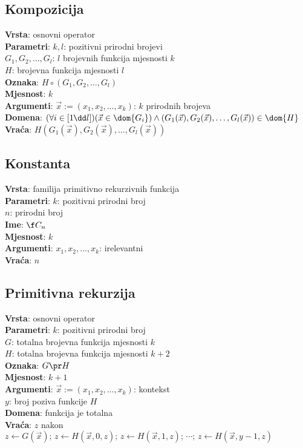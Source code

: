 \subsection{Kompozicija}
\textbf{Vrsta}: osnovni operator\\
\textbf{Parametri}: $k,l$: pozitivni prirodni brojevi\\
$G_1,G_2,\dots,G_l$: $l$ brojevnih funkcija mjesnosti $k$\\
$H$: brojevna funkcija mjesnosti $l$\\
\textbf{Oznaka}: $H\circ(G_1,G_2,\dots,G_l)$\\
\textbf{Mjesnost}: $k$\\
\textbf{Argumenti}: $\vec x:=(x_1,x_2,\dots,x_k)$: $k$ prirodnih brojeva\\
\textbf{Domena}: $(\forall i\in[1\mspace{-1mu}\dd l])(\vec x\in\dom{G_i})\land(G_1(\vec x),G_2(\vec x),\dots,G_l(\vec x))\in\dom{H}$\\
\textbf{Vraća}: $H(G_1(\vec x),G_2(\vec x),\dots,G_l(\vec x))$

\subsection{Konstanta}
\textbf{Vrsta}: familija primitivno rekurzivnih funkcija\\
\textbf{Parametri}: $k$: pozitivni prirodni broj\\
$n$: prirodni broj\\
\textbf{Ime}: $\f C_n$\\
\textbf{Mjesnost}: $k$\\
\textbf{Argumenti}: $x_1,x_2,\dots,x_k$: irelevantni\\
\textbf{Vraća}: $n$

\subsection{Primitivna rekurzija}
\textbf{Vrsta}: osnovni operator\\
\textbf{Parametri}: $k$: pozitivni prirodni broj\\
$G$: totalna brojevna funkcija mjesnosti $k$\\
$H$: totalna brojevna funkcija mjesnosti $k+2$\\
\textbf{Oznaka}: $G\pr H$\\
\textbf{Mjesnost}: $k+1$\\
\textbf{Argumenti}: $\vec x:=(x_1,x_2,\dots,x_k)$: kontekst\\
$y$: broj poziva funkcije $H$\\
\textbf{Domena}: funkcija je totalna\\
\textbf{Vraća}: $z$ nakon $z\leftarrow G(\vec x);\,z\leftarrow H(\vec x,0,z);\,z\leftarrow H(\vec x,1,z);\,\dotsm;\,z\leftarrow H(\vec x,y-1,z)$

